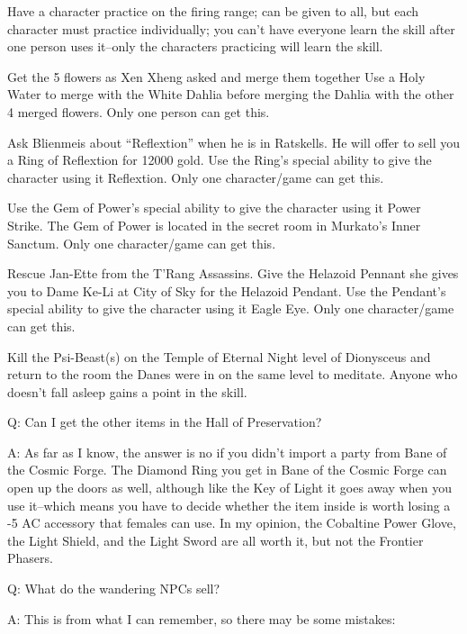 \documentclass[12pt]{article}
\begin{document}
\begin{description}[align=left]
\item [Firearms] Have a character practice on the firing range; can be given
  to all, but each character must practice individually; you can't have
  everyone learn the skill after one person uses it--only the characters
  practicing will learn the skill.
\item [Snakespeed] Get the 5 flowers as Xen Xheng asked and merge them
  together Use a Holy Water to merge with the White Dahlia before merging the
  Dahlia with the other 4 merged flowers. Only one person can get this.
\item [Reflextion] Ask Blienmeis about ``Reflextion'' when he is in
  Ratskells. He will offer to sell you a Ring of Reflextion for 12000 gold.
  Use the Ring's special ability to give the character using it
  Reflextion. Only one character/game can get this.
\item [Power Strike] Use the Gem of Power's special ability to give the
  character using it Power Strike. The Gem of Power is located in the secret
  room in Murkato's Inner Sanctum. Only one character/game can get this.
\item [Eagle Eye] Rescue Jan-Ette from the T'Rang Assassins. Give the
  Helazoid Pennant she gives you to Dame Ke-Li at City of Sky for the
  Helazoid Pendant. Use the Pendant's special ability to give the character
  using it Eagle Eye. Only one character/game can get this.
\item [Mind Control] Kill the Psi-Beast(s) on the Temple of Eternal Night
  level of Dionysceus and return to the room the Danes were in on the same
  level to meditate. Anyone who doesn't fall asleep gains a point in the
  skill.
\end{description}


Q: Can I get the other items in the Hall of Preservation?

A: As far as I know, the answer is no if you didn't import a party from
Bane of the Cosmic Forge. The Diamond Ring you get in Bane of the Cosmic
Forge can open up the doors as well, although like the Key of Light it
goes away when you use it--which means you have to decide whether the
item inside is worth losing a -5 AC accessory that females can use. In
my opinion, the Cobaltine Power Glove, the Light Shield, and the Light
Sword are all worth it, but not the Frontier Phasers.

Q: What do the wandering NPCs sell?

A: This is from what I can remember, so there may be some mistakes:
\end{document}

